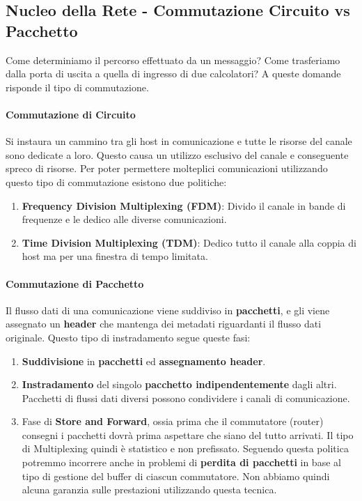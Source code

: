\documentclass{article}
\begin{document}
\newpage

\subsection{Nucleo della Rete - Commutazione Circuito vs Pacchetto}

Come determiniamo il percorso effettuato da un messaggio? Come trasferiamo dalla porta di uscita a quella di ingresso di due calcolatori? A queste domande
risponde il tipo di commutazione.

\paragraph{Commutazione di Circuito}

Si instaura un cammino tra gli host in comunicazione e tutte le risorse del canale sono dedicate a loro. Questo causa un utilizzo esclusivo del canale e conseguente spreco
di risorse. Per poter permettere molteplici comunicazioni utilizzando questo tipo di commutazione esistono due politiche:

\begin{enumerate}
    \item \textbf{Frequency Division Multiplexing (FDM)}: Divido il canale in bande di frequenze e le dedico alle diverse comunicazioni.
    \item \textbf{Time Division Multiplexing (TDM)}: Dedico tutto il canale alla coppia di host ma per una finestra di tempo limitata.
\end{enumerate}

\paragraph{Commutazione di Pacchetto}

Il flusso dati di una comunicazione viene suddiviso in \textbf{pacchetti}, e gli viene assegnato un \textbf{header} che mantenga dei metadati riguardanti il flusso dati originale.
Questo tipo di instradamento segue queste fasi:

\begin{enumerate}
    \item \textbf{Suddivisione} in \textbf{pacchetti} ed \textbf{assegnamento header}.
    \item \textbf{Instradamento} del singolo \textbf{pacchetto indipendentemente} dagli altri. Pacchetti di flussi dati diversi possono condividere i canali di comunicazione.
    \item Fase di \textbf{Store and Forward}, ossia prima che il commutatore (router) consegni i pacchetti dovrà prima aspettare che siano del tutto arrivati. Il tipo di Multiplexing
    quindi è statistico e non prefissato. Seguendo questa politica potremmo incorrere anche in problemi di \textbf{perdita di pacchetti} in base al tipo di gestione del buffer di ciascun commutatore.
    Non abbiamo quindi alcuna garanzia sulle prestazioni utilizzando questa tecnica. 
\end{enumerate}
\end{document}
